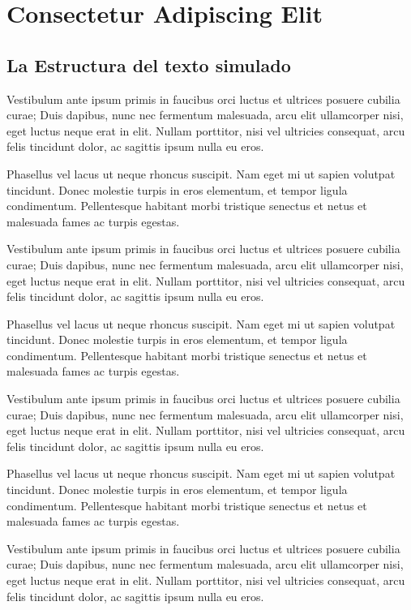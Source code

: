 \chapter{Consectetur Adipiscing Elit}

\section{La Estructura del texto simulado}

Vestibulum ante ipsum primis in faucibus orci luctus et ultrices posuere cubilia curae; Duis dapibus, nunc nec fermentum malesuada, arcu elit ullamcorper nisi, eget luctus neque erat in elit. Nullam porttitor, nisi vel ultricies consequat, arcu felis tincidunt dolor, ac sagittis ipsum nulla eu eros.

Phasellus vel lacus ut neque rhoncus suscipit. Nam eget mi ut sapien volutpat tincidunt. Donec molestie turpis in eros elementum, et tempor ligula condimentum. Pellentesque habitant morbi tristique senectus et netus et malesuada fames ac turpis egestas.

Vestibulum ante ipsum primis in faucibus orci luctus et ultrices posuere cubilia curae; Duis dapibus, nunc nec fermentum malesuada, arcu elit ullamcorper nisi, eget luctus neque erat in elit. Nullam porttitor, nisi vel ultricies consequat, arcu felis tincidunt dolor, ac sagittis ipsum nulla eu eros.

Phasellus vel lacus ut neque rhoncus suscipit. Nam eget mi ut sapien volutpat tincidunt. Donec molestie turpis in eros elementum, et tempor ligula condimentum. Pellentesque habitant morbi tristique senectus et netus et malesuada fames ac turpis egestas.

Vestibulum ante ipsum primis in faucibus orci luctus et ultrices posuere cubilia curae; Duis dapibus, nunc nec fermentum malesuada, arcu elit ullamcorper nisi, eget luctus neque erat in elit. Nullam porttitor, nisi vel ultricies consequat, arcu felis tincidunt dolor, ac sagittis ipsum nulla eu eros.

Phasellus vel lacus ut neque rhoncus suscipit. Nam eget mi ut sapien volutpat tincidunt. Donec molestie turpis in eros elementum, et tempor ligula condimentum. Pellentesque habitant morbi tristique senectus et netus et malesuada fames ac turpis egestas.

Vestibulum ante ipsum primis in faucibus orci luctus et ultrices posuere cubilia curae; Duis dapibus, nunc nec fermentum malesuada, arcu elit ullamcorper nisi, eget luctus neque erat in elit. Nullam porttitor, nisi vel ultricies consequat, arcu felis tincidunt dolor, ac sagittis ipsum nulla eu eros.

